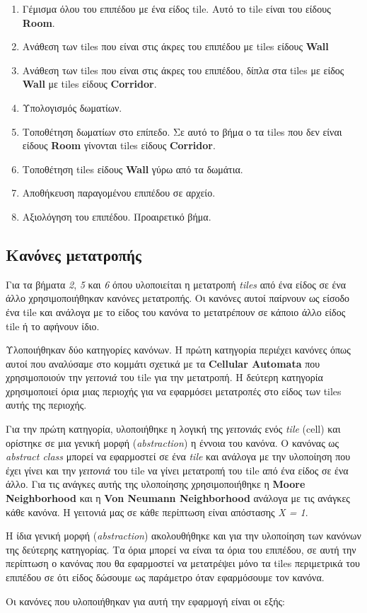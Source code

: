 \begin{enumerate}
	\item Γέμισμα όλου του επιπέδου με ένα είδος tile. Αυτό το tile είναι του είδους \textbf{Room}.
	\item Ανάθεση των tiles που είναι στις άκρες του επιπέδου με tiles είδους \textbf{Wall}
	\item Ανάθεση των tiles που είναι στις άκρες του επιπέδου, δίπλα στα tiles με είδος \textbf{Wall} με tiles είδους \textbf{Corridor}.
	\item Υπολογισμός δωματίων.
	\item Τοποθέτηση δωματίων στο επίπεδο. Σε αυτό το βήμα ο τα tiles που δεν είναι είδους \textbf{Room} γίνονται tiles είδους \textbf{Corridor}.
	\item Τοποθέτηση tiles είδους \textbf{Wall} γύρω από τα δωμάτια.
	\item Αποθήκευση παραγομένου επιπέδου σε αρχείο.
	\item Αξιολόγηση του επιπέδου. Προαιρετικό βήμα.
\end{enumerate}


\subsection{Κανόνες μετατροπής}
Για τα βήματα \textit{2}, \textit{5} και \textit{6} όπου υλοποιείται η μετατροπή \textit{tiles} από ένα είδος σε ένα άλλο χρησιμοποιήθηκαν κανόνες μετατροπής. Οι κανόνες αυτοί παίρνουν ως είσοδο ένα tile και ανάλογα με το είδος του κανόνα το μετατρέπουν σε κάποιο άλλο είδος tile ή το αφήνουν ίδιο.
\par
Υλοποιήθηκαν δύο κατηγορίες κανόνων. H πρώτη κατηγορία περιέχει κανόνες όπως αυτοί που αναλύσαμε στο κομμάτι σχετικά με τα \textbf{Cellular Automata} που χρησιμοποιούν την \textit{γειτονιά} του tile για την μετατροπή. Η δεύτερη κατηγορία χρησιμοποιεί όρια μιας περιοχής για να εφαρμόσει μετατροπές στο είδος των tiles αυτής της περιοχής. 
\par
Για την πρώτη κατηγορία, υλοποιήθηκε η λογική της \textit{γειτονιάς} ενός \textit{tile} (cell) και ορίστηκε σε μια γενική μορφή (\textit{abstraction}) η έννοια του κανόνα. Ο κανόνας ως \textit{abstract class} μπορεί να εφαρμοστεί σε ένα \textit{tile} και ανάλογα με την υλοποίηση που έχει γίνει και την \textit{γειτονιά} του tile να γίνει μετατροπή του tile από ένα είδος σε ένα άλλο. Για τις ανάγκες αυτής της υλοποίησης χρησιμοποιήθηκε η \textbf{Moore Neighborhood} και η \textbf{Von Neumann Neighborhood} ανάλογα με τις ανάγκες κάθε κανόνα. Η γειτονιά μας σε κάθε περίπτωση είναι απόστασης \textit{X = 1}.
\par
Η ίδια γενική μορφή (\textit{abstraction}) ακολουθήθηκε και για την υλοποίηση των κανόνων της δεύτερης κατηγορίας. Τα όρια μπορεί να είναι τα όρια του επιπέδου, σε αυτή την περίπτωση ο κανόνας που θα εφαρμοστεί να μετατρέψει μόνο τα tiles περιμετρικά του επιπέδου σε ότι είδος δώσουμε ως παράμετρο όταν εφαρμόσουμε τον κανόνα.
\par
Οι κανόνες που υλοποιήθηκαν για αυτή την εφαρμογή είναι οι εξής:

